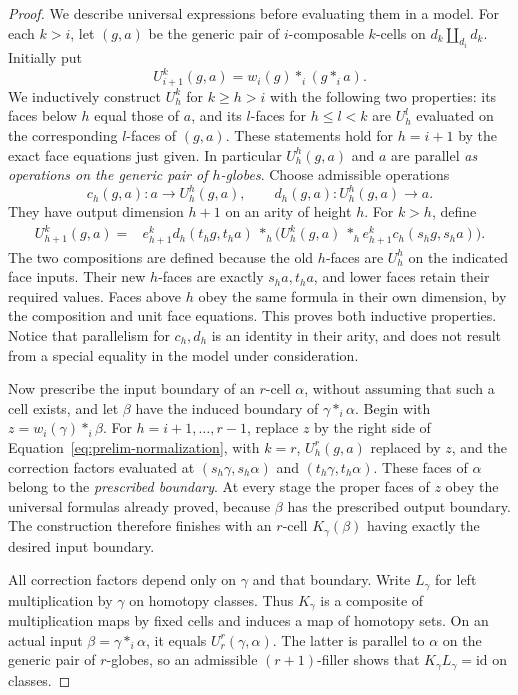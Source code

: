 \documentclass[11pt,letterpaper]{article}
\numberwithin{equation}{section}
\theoremstyle{plain}
\theoremstyle{definition}
\theoremstyle{remark}
\newcommand{\id}{\mathrm{id}}
\begin{document}
\begin{proof}
We describe universal expressions before evaluating them in a model.
For each $k>i$, let $(g,a)$ be the generic pair of $i$-composable
$k$-cells on $d_k\amalg_{d_i}d_k$.  Initially put
\[
 U_{i+1}^k(g,a)=w_i(g)*_i(g*_i a).
\]
We inductively construct $U_h^k$ for $k\ge h>i$ with the following
two properties: its faces below $h$ equal those of $a$, and its
$l$-faces for $h\le l<k$ are $U_h^l$ evaluated on the corresponding
$l$-faces of $(g,a)$.  These statements hold for $h=i+1$ by the
exact face equations just given.  In particular $U_h^h(g,a)$ and
$a$ are parallel \emph{as operations on the generic pair of
$h$-globes}.  Choose admissible operations
\[
 c_h(g,a):a\longrightarrow U_h^h(g,a),\qquad
 d_h(g,a):U_h^h(g,a)\longrightarrow a.
\]
They have output dimension $h+1$ on an arity of height $h$.
For $k>h$, define
\begin{equation}\label{eq:prelim-normalization}
 \begin{split}
 U_{h+1}^k(g,a)={}&
 e_{h+1}^k d_h(t_hg,t_ha)\ *_h\bigl(
 U_h^k(g,a)\ *_h e_{h+1}^k c_h(s_hg,s_ha)\bigr).
 \end{split}
\end{equation}
The two compositions are defined because the old $h$-faces are
$U_h^h$ on the indicated face inputs.  Their new $h$-faces are
exactly $s_ha,t_ha$, and lower faces retain their required values.
Faces above $h$ obey the same formula in their own dimension,
by the composition and unit face equations.  This proves both
inductive properties.  Notice that parallelism for $c_h,d_h$ is
an identity in their arity, and does not result from a special
equality in the model under consideration.

Now prescribe the input boundary of an $r$-cell $\alpha$, without
assuming that such a cell exists, and let $\beta$ have the induced
boundary of $\gamma*_i\alpha$.  Begin with
$z=w_i(\gamma)*_i\beta$.  For $h=i+1,\ldots,r-1$, replace $z$ by
the right side of Equation~\eqref{eq:prelim-normalization}, with
$k=r$, $U_h^r(g,a)$ replaced by $z$, and the correction factors
evaluated at $(s_h\gamma,s_h\alpha)$ and
$(t_h\gamma,t_h\alpha)$.  These faces of $\alpha$ belong to the
\emph{prescribed boundary}.  At every stage the proper faces of
$z$ obey the universal formulas already proved, because
$\beta$ has the prescribed output boundary.  The construction
therefore finishes with an $r$-cell $K_\gamma(\beta)$ having
exactly the desired input boundary.

All correction factors depend only on $\gamma$ and that boundary.
Write $L_\gamma$ for left multiplication by $\gamma$ on homotopy classes.
Thus $K_\gamma$ is a composite of multiplication maps by fixed
cells and induces a map of homotopy sets.  On an actual input
$\beta=\gamma*_i\alpha$, it equals $U_r^r(\gamma,\alpha)$.
The latter is parallel to $\alpha$ on the generic pair of
$r$-globes, so an admissible $(r+1)$-filler shows that
$K_\gamma L_\gamma=\id$ on classes.


\end{proof}
\end{document}
